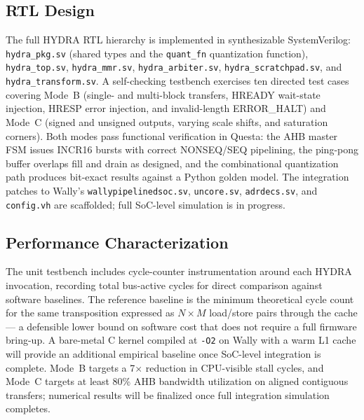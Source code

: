 \documentclass[conference]{IEEEtran}
\begin{document}
    \subsection{RTL Design}
        The full HYDRA RTL hierarchy is implemented in synthesizable 
        SystemVerilog: \texttt{hydra\_pkg.sv} (shared types and the 
        \texttt{quant\_fn} quantization function), \texttt{hydra\_top.sv}, 
        \texttt{hydra\_mmr.sv}, \texttt{hydra\_arbiter.sv}, 
        \texttt{hydra\_scratchpad.sv}, and \texttt{hydra\_transform.sv}. A 
        self-checking testbench exercises ten directed test cases covering 
        Mode~B (single- and multi-block transfers, HREADY wait-state injection, 
        HRESP error injection, and invalid-length ERROR\_HALT) and Mode~C 
        (signed and unsigned outputs, varying scale shifts, and saturation 
        corners). Both modes pass functional verification in Questa: the AHB 
        master FSM issues INCR16 bursts with correct NONSEQ/SEQ pipelining, 
        the ping-pong buffer overlaps fill and drain as designed, and the 
        combinational quantization path produces bit-exact results against a 
        Python golden model. The integration patches to Wally's 
        \texttt{wallypipelinedsoc.sv}, \texttt{uncore.sv}, \texttt{adrdecs.sv}, 
        and \texttt{config.vh} are scaffolded; full SoC-level simulation is 
        in progress.
    \subsection{Performance Characterization}
        The unit testbench includes cycle-counter instrumentation around each 
        HYDRA invocation, recording total bus-active cycles for direct 
        comparison against software baselines. The reference baseline is the 
        minimum theoretical cycle count for the same transposition expressed 
        as $N \times M$ load/store pairs through the cache --- a defensible 
        lower bound on software cost that does not require a full firmware 
        bring-up. A bare-metal C kernel compiled at \texttt{-O2} on Wally 
        with a warm L1 cache will provide an additional empirical baseline 
        once SoC-level integration is complete. Mode~B targets a 7$\times$ 
        reduction in CPU-visible stall cycles, and Mode~C targets at least 
        80\% AHB bandwidth utilization on aligned contiguous transfers; 
        numerical results will be finalized once full integration simulation 
        completes.
\end{document}
